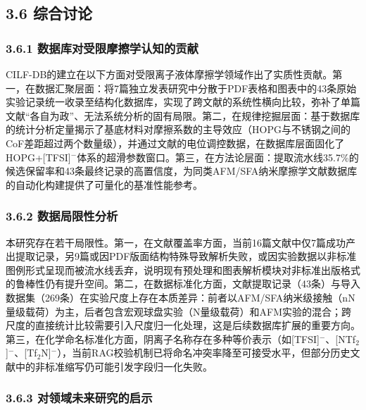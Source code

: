 \hypertarget{ux7efcux5408ux8ba8ux8bba}{%
\subsection{3.6 综合讨论}\label{ux7efcux5408ux8ba8ux8bba}}

\hypertarget{ux6570ux636eux5e93ux5bf9ux53d7ux9650ux6469ux64e6ux5b66ux8ba4ux77e5ux7684ux8d21ux732e}{%
\subsubsection{3.6.1 数据库对受限摩擦学认知的贡献}\label{ux6570ux636eux5e93ux5bf9ux53d7ux9650ux6469ux64e6ux5b66ux8ba4ux77e5ux7684ux8d21ux732e}}

CILF-DB的建立在以下方面对受限离子液体摩擦学领域作出了实质性贡献。第一，在数据汇聚层面：将7篇独立发表研究中分散于PDF表格和图表中的43条原始实验记录统一收录至结构化数据库，实现了跨文献的系统性横向比较，弥补了单篇文献``各自为政''、无法系统分析的固有局限。第二，在规律挖掘层面：基于数据库的统计分析定量揭示了基底材料对摩擦系数的主导效应（HOPG与不锈钢之间的CoF差距超过两个数量级），并通过文献\cite{ref11}的电位调控数据，在数据库层面固化了HOPG+{[}TFSI{]}$^{-}$体系的超滑参数窗口。第三，在方法论层面：提取流水线35.7\%的候选保留率和43条最终记录的高置信度，为同类AFM/SFA纳米摩擦学文献数据库的自动化构建提供了可量化的基准性能参考。

\hypertarget{ux6570ux636eux5c40ux9650ux6027ux5206ux6790}{%
\subsubsection{3.6.2 数据局限性分析}\label{ux6570ux636eux5c40ux9650ux6027ux5206ux6790}}

本研究存在若干局限性。第一，在文献覆盖率方面，当前16篇文献中仅7篇成功产出提取记录，另9篇或因PDF版面结构特殊导致解析失败，或因实验数据以非标准图例形式呈现而被流水线丢弃，说明现有预处理和图表解析模块对非标准出版格式的鲁棒性仍有提升空间。第二，在数据标准化方面，文献提取记录（43条）与导入数据集（269条）在实验尺度上存在本质差异：前者以AFM/SFA纳米级接触（nN量级载荷）为主，后者包含宏观球盘实验（N量级载荷）和AFM实验的混合；跨尺度的直接统计比较需要引入尺度归一化处理，这是后续数据库扩展的重要方向。第三，在化学命名标准化方面，阴离子名称存在多种等价表示（如{[}TFSI{]}$^{-}$、{[}NTf$_{2}${]}$^{-}$、{[}Tf$_{2}$N{]}$^{-}$），当前RAG校验机制已将命名冲突率降至可接受水平，但部分历史文献中的非标准缩写仍可能引发字段归一化失败。

\hypertarget{ux5bf9ux9886ux57dfux672aux6765ux7814ux7a76ux7684ux542fux793a}{%
\subsubsection{3.6.3 对领域未来研究的启示}\label{ux5bf9ux9886ux57dfux672aux6765ux7814ux7a76ux7684ux542fux793a}}

